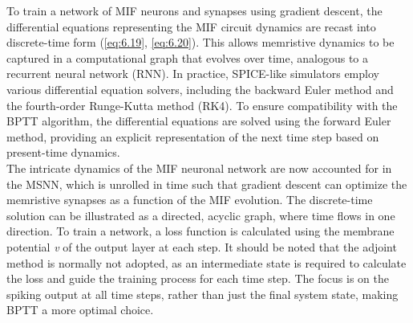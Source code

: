 
\noindent To train a network of MIF neurons and synapses using gradient descent, the differential equations representing the MIF circuit dynamics are recast into discrete-time form (\ref{eq:6.19}, \ref{eq:6.20}). This allows memristive dynamics to be captured in a computational graph that evolves over time, analogous to a recurrent neural network (RNN). In practice, SPICE-like simulators employ various differential equation solvers, including the backward Euler method and the fourth-order Runge-Kutta method (RK4). To ensure compatibility with the BPTT algorithm, the differential equations are solved using the forward Euler method, providing an explicit representation of the next time step based on present-time dynamics. \\



\noindent The intricate dynamics of the MIF neuronal network are now accounted for in the MSNN, which is unrolled in time such that gradient descent can optimize the memristive synapses as a function of the MIF evolution. The discrete-time solution can be illustrated as a directed, acyclic graph, where time flows in one direction. To train a network, a loss function is calculated using the membrane potential \textit{v} of the output layer at each step. It should be noted that the adjoint method \cite{chen2018neural} is normally not adopted, as an intermediate state is required to calculate the loss and guide the training process for each time step. The focus is on the spiking output at all time steps, rather than just the final system state, making BPTT a more optimal choice.\\

